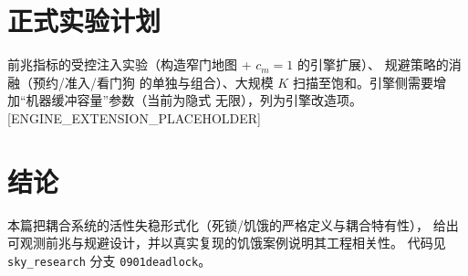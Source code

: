 \documentclass[UTF8,12pt,a4paper]{ctexart}
\begin{document}
\section{正式实验计划}

前兆指标的受控注入实验（构造窄门地图 + $c_m{=}1$ 的引擎扩展）、
规避策略的消融（预约/准入/看门狗 的单独与组合）、大规模
$K$ 扫描至饱和。引擎侧需要增加``机器缓冲容量''参数（当前为隐式
无限），列为引擎改造项。[ENGINE\_EXTENSION\_PLACEHOLDER]

\section{结论}

本篇把耦合系统的活性失稳形式化（死锁/饥饿的严格定义与耦合特有性），
给出可观测前兆与规避设计，并以真实复现的饥饿案例说明其工程相关性。
代码见 \texttt{sky\_research} 分支 \texttt{0901deadlock}。



\end{document}
